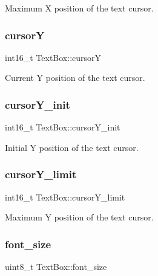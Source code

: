 Maximum X position of the text cursor. 

\mbox{\label{group__textbox_ga486d45b3fcf48020cc4fef908d1a32ec}} 
\subsubsection{\texorpdfstring{cursorY}{cursorY}}
{\footnotesize\ttfamily int16\+\_\+t Text\+Box\+::cursorY}



Current Y position of the text cursor. 

\mbox{\label{group__textbox_ga9dc197044dc20a082831cc2f5aea2661}} 
\subsubsection{\texorpdfstring{cursor\+Y\+\_\+init}{cursorY\_init}}
{\footnotesize\ttfamily int16\+\_\+t Text\+Box\+::cursor\+Y\+\_\+init}



Initial Y position of the text cursor. 

\mbox{\label{group__textbox_gaba5e128238452d3662929d023ab898cb}} 
\subsubsection{\texorpdfstring{cursor\+Y\+\_\+limit}{cursorY\_limit}}
{\footnotesize\ttfamily int16\+\_\+t Text\+Box\+::cursor\+Y\+\_\+limit}



Maximum Y position of the text cursor. 

\mbox{\label{group__textbox_ga2279e6ddc6b689e797f73fbee37f2681}} 
\subsubsection{\texorpdfstring{font\+\_\+size}{font\_size}}
{\footnotesize\ttfamily uint8\+\_\+t Text\+Box\+::font\+\_\+size}



